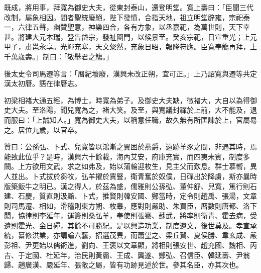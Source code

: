 \begin{pinyinscope}
既成，將用事，拜寬為御史大夫，從東封泰山，還登明堂。寬上壽曰：「臣聞三代改制，屬象相因。間者聖統廢絕，陛下發憤，合指天地，祖立明堂辟雍，宗祀泰一，六律五聲，幽贊聖意，神樂四合，各有方象，以丞嘉祀，為萬世則，天下幸甚。將建大元本瑞，登告岱宗，發祉闓門，以候景至。癸亥宗祀，日宣重光；上元甲子，肅邕永享。光輝充塞，天文粲然，充象日昭，報降符應。臣寬奉觴再拜，上千萬歲壽。」制曰：「敬舉君之觴。」

後太史令司馬遷等言：「曆紀壞廢，漢興未改正朔，宜可正。」上乃詔寬與遷等共定漢太初曆。語在律曆志。

初梁相褚大通五經，為博士，時寬為弟子。及御史大夫缺，徵褚大，大自以為得御史大夫。至洛陽，聞兒寬為之，褚大笑。及至，與寬議封禪於上前，大不能及，退而服曰：「上誠知人。」寬為御史大夫，以稱意任職，故久無有所匡諫於上，官屬易之。居位九歲，以官卒。

贊曰：公孫弘、卜式、兒寬皆以鴻漸之翼困於燕爵，遠跡羊豕之間，非遇其時，焉能致此位乎？是時，漢興六十餘載，海內艾安，府庫充實，而四夷未賓，制度多闕。上方欲用文武，求之如弗及，始以蒲輪迎枚生，見主父而歎息。群士慕嚮，異人並出。卜式拔於芻牧，弘羊擢於賈豎，衛青奮於奴僕，日磾出於降虜，斯亦曩時版築飯牛之明已。漢之得人，於茲為盛，儒雅則公孫弘、董仲舒、兒寬，篤行則石建、石慶，質直則汲黯、卜式，推賢則韓安國、鄭當時，定令則趙禹、張湯，文章則司馬遷、相如，滑稽則東方朔、枚皋，應對則嚴助、朱買臣，曆數則唐都、洛下閎，協律則李延年，運籌則桑弘羊，奉使則張騫、蘇武，將率則衛青、霍去病，受遺則霍光、金日磾，其餘不可勝紀。是以興造功業，制度遺文，後世莫及。孝宣承統，纂修洪業，亦講論六藝，招選茂異，而蕭望之、梁丘賀、夏侯勝、韋玄成、嚴彭祖、尹更始以儒術進，劉向、王褒以文章顯，將相則張安世、趙充國、魏相、丙吉、于定國、杜延年，治民則黃霸、王成、龔遂、鄭弘、召信臣、韓延壽、尹翁歸、趙廣漢、嚴延年、張敞之屬，皆有功跡見述於世。參其名臣，亦其次也。


\end{pinyinscope}